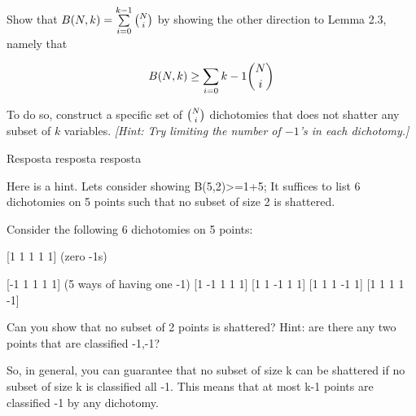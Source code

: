 \begin{enunciado}{4}
    Show that $B(N, k) = \sum\limits_{i=0}^{k-1} {{N} \choose {i}}$ by showing
    the other direction to Lemma 2.3, namely that
    
    $$ B(N, k) \ge \sum\limits_{i=0}{k-1} {{N} \choose {i}} $$
    
    To do so, construct a specific set of ${{N} \choose {i}}$ dichotomies that
    does not shatter any subset of $k$ variables. \textit{[Hint: Try limiting the number of $-1$'s in each dichotomy.]}
    
\end{enunciado}

Resposta resposta resposta

Here is a hint. Lets consider showing B(5,2)>=1+5; It suffices to list 6 dichotomies on 5 points such that no subset of size 2 is shattered.

Consider the following 6 dichotomies on 5 points:

[1 1 1 1 1] (zero -1s)

[-1 1 1 1 1] (5 ways of having one -1)
[1 -1 1 1 1]
[1 1 -1 1 1]
[1 1 1 -1 1]
[1 1 1 1 -1]

Can you show that no subset of 2 points is shattered? Hint: are there any two points that are classified -1,-1?

So, in general, you can guarantee that no subset of size k can be shattered if no subset of size k is classified all -1. This means that at most k-1 points are classified -1 by any dichotomy.

